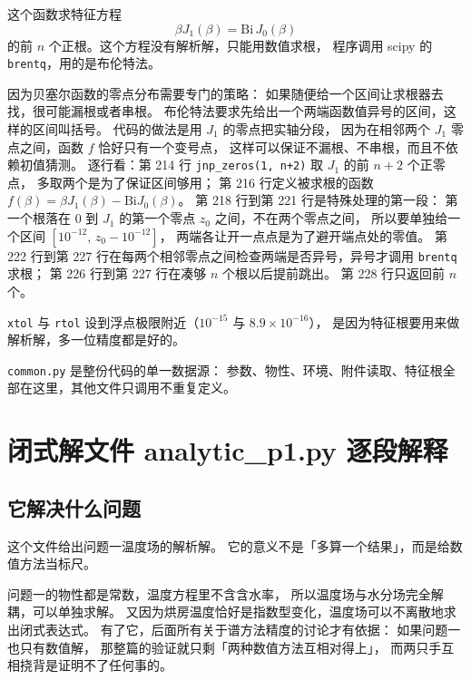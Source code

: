 这个函数求特征方程
\begin{equation}
\beta J_1(\beta)=\mathrm{Bi}\,J_0(\beta)
\end{equation}
的前 $n$ 个正根。这个方程没有解析解，只能用数值求根，
程序调用 scipy 的 \texttt{brentq}，用的是布伦特法。

因为贝塞尔函数的零点分布需要专门的策略：
如果随便给一个区间让求根器去找，很可能漏根或者串根。
布伦特法要求先给出一个两端函数值异号的区间，这样的区间叫括号。
代码的做法是用 $J_1$ 的零点把实轴分段，
因为在相邻两个 $J_1$ 零点之间，函数 $f$ 恰好只有一个变号点，
这样可以保证不漏根、不串根，而且不依赖初值猜测。
逐行看：第 214 行 \texttt{jnp\_zeros(1, n+2)} 取 $J_1$ 的前 $n+2$ 个正零点，
多取两个是为了保证区间够用；
第 216 行定义被求根的函数 $f(\beta)=\beta J_1(\beta)-\mathrm{Bi}J_0(\beta)$。
第 218 行到第 221 行是特殊处理的第一段：
第一个根落在 $0$ 到 $J_1$ 的第一个零点 $z_0$ 之间，不在两个零点之间，
所以要单独给一个区间 $[10^{-12},\,z_0-10^{-12}]$，
两端各让开一点点是为了避开端点处的零值。
第 222 行到第 227 行在每两个相邻零点之间检查两端是否异号，异号才调用 \texttt{brentq} 求根；
第 226 行到第 227 行在凑够 $n$ 个根以后提前跳出。
第 228 行只返回前 $n$ 个。

\texttt{xtol} 与 \texttt{rtol} 设到浮点极限附近（$10^{-15}$ 与 $8.9\times10^{-16}$），
是因为特征根要用来做解析解，多一位精度都是好的。

\keypoint
\texttt{common.py} 是整份代码的单一数据源：
参数、物性、环境、附件读取、特征根全部在这里，其他文件只调用不重复定义。

\section{闭式解文件 analytic\_p1.py 逐段解释}

\subsection{它解决什么问题}

这个文件给出问题一温度场的解析解。
它的意义不是「多算一个结果」，而是给数值方法当标尺。

问题一的物性都是常数，温度方程里不含含水率，
所以温度场与水分场完全解耦，可以单独求解。
又因为烘房温度恰好是指数型变化，温度场可以不离散地求出闭式表达式。
有了它，后面所有关于谱方法精度的讨论才有依据：
如果问题一也只有数值解，
那整篇的验证就只剩「两种数值方法互相对得上」，
而两只手互相挠背是证明不了任何事的。

